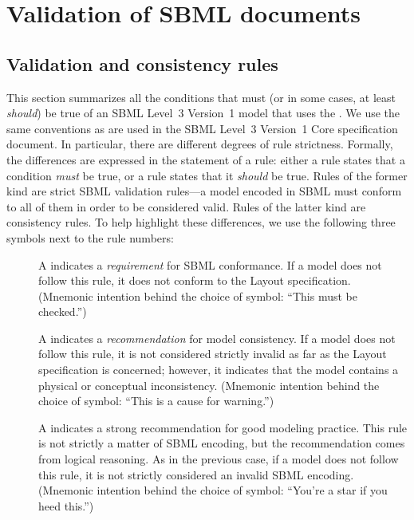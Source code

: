 \section{Validation of SBML documents}
\label{apdx-validation}

\subsection{Validation and consistency rules}
\label{validation-rules}

This section summarizes all the conditions that must (or in some cases,
at least \emph{should}) be true of an SBML Level~3 Version~1 model that
uses the \LayoutPackage.  We use the same
conventions as are used in the SBML Level~3 Version~1 Core specification
document.  In particular, there are different degrees of rule
strictness.  Formally, the differences are expressed in the statement of
a rule: either a rule states that a condition \emph{must} be true, or a
rule states that it \emph{should} be true.  Rules of the former kind are
strict SBML validation rules---a model encoded in SBML must conform to
all of them in order to be considered valid.  Rules of the latter kind
are consistency rules.  To help highlight these differences, we use the
following three symbols next to the rule numbers:

\begin{description}

\item[\hspace*{6.5pt}\vSymbol\vsp] A \vSymbolName indicates a
  \emph{requirement} for SBML conformance. If a model does not follow
  this rule, it does not conform to the Layout
  specification.  (Mnemonic intention behind the choice of symbol:
  ``This must be checked.'')

\item[\hspace*{6.5pt}\cSymbol\csp] A \cSymbolName indicates a
  \emph{recommendation} for model consistency.  If a model does not
  follow this rule, it is not considered strictly invalid as far as
  the Layout specification is concerned;
  however, it indicates that the model contains a physical or
  conceptual inconsistency.  (Mnemonic intention behind the choice of
  symbol: ``This is a cause for warning.'')

\item[\hspace*{6.5pt}\mSymbol\msp] A \mSymbolName indicates a strong
  recommendation for good modeling practice.  This rule is not
  strictly a matter of SBML encoding, but the recommendation comes
  from logical reasoning.  As in the previous case, if a model does
  not follow this rule, it is not strictly considered an invalid SBML
  encoding.  (Mnemonic intention behind the choice of symbol: ``You're
  a star if you heed this.'')

\end{description}

